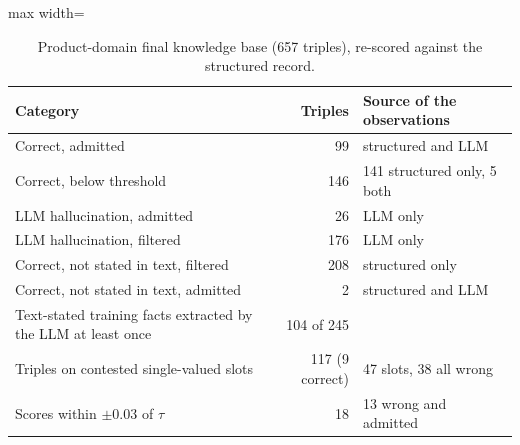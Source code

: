 \documentclass[11pt]{article}
\begin{document}
\begin{table}[htbp]
\centering
\caption{Product-domain final knowledge base (657 triples), re-scored
against the structured record.}
\label{tab:s9-counts}
\begin{adjustbox}{max width=\textwidth}
\begin{tabular}{@{}lrl@{}}
\toprule
Category & Triples & Source of the observations \\
\midrule
Correct, admitted & 99 & structured and LLM \\
Correct, below threshold & 146 & 141 structured only, 5 both \\
LLM hallucination, admitted & 26 & LLM only \\
LLM hallucination, filtered & 176 & LLM only \\
Correct, not stated in text, filtered & 208 & structured only \\
Correct, not stated in text, admitted & 2 & structured and LLM \\
\midrule
Text-stated training facts extracted by the LLM at least once & 104 of 245 & \\
Triples on contested single-valued slots & 117 (9 correct) & 47 slots, 38 all wrong \\
Scores within $\pm0.03$ of $\tau$ & 18 & 13 wrong and admitted \\
\bottomrule
\end{tabular}
\end{adjustbox}
\end{table}
\end{document}
